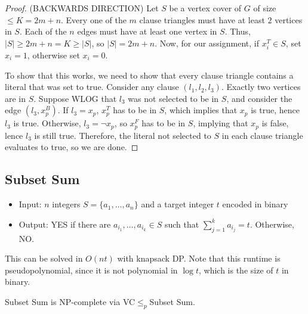 \begin{proof}
\hrulebar

(BACKWARDS DIRECTION) Let $S$ be a vertex cover of $G$ of size $\leq K=2m+n$. Every one of the $m$ clause triangles must have at least $2$ vertices in $S$. Each of the $n$ edges must have at least one vertex in $S$. Thus, $\vert S\vert \geq 2m+n = K \geq \vert S\vert$, so $\vert S\vert = 2m+n$. Now, for our assignment, if $x_i^T\in S$, set $x_i=1$, otherwise set $x_i=0$. 

To show that this works, we need to show that every clause triangle contains a literal that was set to true. Consider any clause $(l_1, l_2, l_3)$. Exactly two vertices are in $S$. Suppose WLOG that $l_3$ was not selected to be in $S$, and consider the edge $(l_3, x_p^B)$. If $l_3=x_p$, $x_p^T$ has to be in $S$, which implies that $x_p$ is true, hence $l_3$ is true. Otherwise, $l_3=\neg x_p$, so $x_p^F$ has to be in $S$, implying that $x_p$ is false, lence $l_3$ is still true. Therefore, the literal not selected to $S$ in each clause triangle evaluates to true, so we are done. 
\end{proof}

\subsection{Subset Sum}
\begin{itemize}
    \item Input: $n$ integers $S=\{a_1, \hdots, a_n\}$ and a target integer $t$ encoded in binary
    \item Output: YES if there are $a_{i_1}, \hdots, a_{i_k}\in S$ such that $\sum_{j=1}^ka_{i_j}=t$. Otherwise, NO. 
\end{itemize}

This can be solved in $O(nt)$ with knapsack DP. Note that this runtime is pseudopolynomial, since it is not polynomial in $\log t$, which is the size of $t$ in binary.

\begin{theorem}
\thmlabel

Subset Sum is NP-complete via VC$\leq_p$Subset Sum.
\end{theorem}

